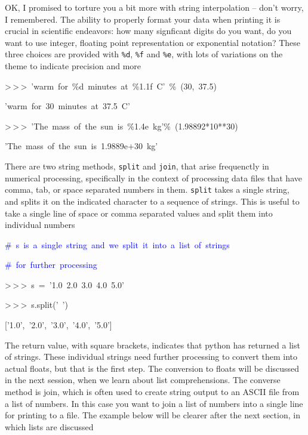 OK, I promised to torture you a bit more with string interpolation
-- don't worry, I remembered. The ability to properly format your
data when printing it is crucial in scientific endeavors: how many
signficant digits do you want, do you want to use integer, floating
point representation or exponential notation? These three choices
are provided with \texttt{\%d}, \texttt{\%f} and \texttt{\%e}, with
lots of variations on the theme to indicate precision and more

\begin{lyxcode}
>\,{}>\,{}>~'warm~for~\%d~minutes~at~\%1.1f~C'~\%~(30,~37.5)

'warm~for~30~minutes~at~37.5~C'



>\,{}>\,{}>~'The~mass~of~the~sun~is~\%1.4e~kg'\%~(1.98892{*}10{*}{*}30)

'The~mass~of~the~sun~is~1.9889e+30~kg'


\end{lyxcode}
There are two string methods, \texttt{split} and \texttt{join}, that arise
frequenctly in numerical processing, specifically in the context of processing
data files that have comma, tab, or space separated numbers in
them. \texttt{split} takes a single string, and splits it on the indicated
character to a sequence of strings. This is useful to take a single line of
space or comma separated values and split them into individual numbers

\begin{lyxcode}
\textcolor{blue}{\#~s~is~a~single~string~and~we~split~it~into~a~list~of~strings}

\textcolor{blue}{\#~for~further~processing}

>\,{}>\,{}>~s~=~'1.0~2.0~3.0~4.0~5.0'

>\,{}>\,{}>~s.split('~')

{[}'1.0',~'2.0',~'3.0',~'4.0',~'5.0']
\end{lyxcode}
The return value, with square brackets, indicates that python has
returned a list of strings. These individual strings need further
processing to convert them into actual floats, but that is the first
step.  The conversion to floats will be discussed in the next session,
when we learn about list comprehensions. The converse method is join,
which is often used to create string output to an ASCII file from
a list of numbers. In this case you want to join a list of numbers
into a single line for printing to a file. The example below will
be clearer after the next section, in which lists are discussed

